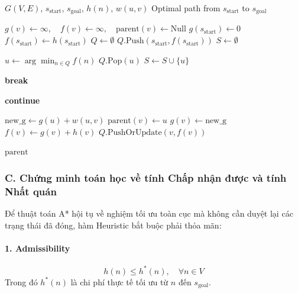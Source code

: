 \documentclass[a4paper, 12pt]{report}
\begin{document}
  \begin{algorithm}[H]
  \caption{A* Pathfinding}
  \begin{algorithmic}[1]
  \Require $G(V, E)$, $s_{\text{start}}$, $s_{\text{goal}}$, $h(n)$, $w(u, v)$
  \Ensure Optimal path from $s_{\text{start}}$ to $s_{\text{goal}}$

      \State $g(v) \gets \infty, \quad f(v) \gets \infty, \quad \text{parent}(v) \gets \text{Null}$
  \EndFor
  \State $g(s_{\text{start}}) \gets 0$
  \State $f(s_{\text{start}}) \gets h(s_{\text{start}})$
  \State $Q \gets \emptyset$
  \State $Q.\text{Push}(s_{\text{start}}, f(s_{\text{start}}))$
  \State $S \gets \emptyset$

      \State $u \gets \arg\min_{n \in Q} f(n)$
      \State $Q.\text{Pop}(u)$
      \State $S \gets S \cup \{u\}$
      
          \State \textbf{break}
      \EndIf
      
              \State \textbf{continue}
          \EndIf
          
          \State $\text{new\_g} \gets g(u) + w(u, v)$
              \State $\text{parent}(v) \gets u$
              \State $g(v) \gets \text{new\_g}$
              \State $f(v) \gets g(v) + h(v)$
              \State $Q.\text{PushOrUpdate}(v, f(v))$
          \EndIf
      \EndFor
  \EndWhile

  \State \Return $\text{parent}$
  \end{algorithmic}
  \end{algorithm}

  \subsubsection{C. Chứng minh toán học về tính Chấp nhận được và tính Nhất quán}

  Để thuật toán A* hội tụ về nghiệm tối ưu toàn cục mà không cần duyệt lại các trạng thái đã đóng, hàm Heuristic bắt buộc phải thỏa mãn:

  \paragraph{1. Admissibility}

      \begin{equation}
      h(n) \leq h^*(n), \quad \forall n \in V
      \end{equation}
      Trong đó $h^*(n)$ là chi phí thực tế tối ưu từ $n$ đến $s_{\text{goal}}$.
      
\end{document}
